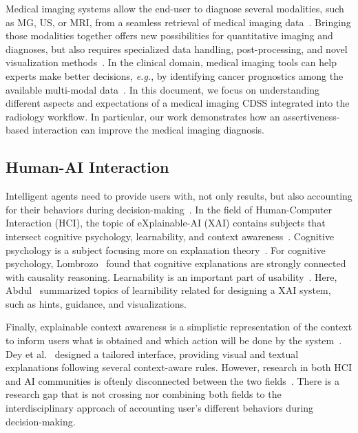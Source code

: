 Medical imaging systems allow the end-user to diagnose several modalities, such as MG, US, or MRI, from a seamless retrieval of medical imaging data~\cite{faraji2019radiologic}.
Bringing those modalities together offers new possibilities for quantitative imaging and diagnoses, but also requires specialized data handling, post-processing, and novel visualization methods~\cite{Igarashi:2016:IVS:2984511.2984537}.
In the clinical domain, medical imaging tools can help experts make better decisions, {\it e.g.}, by identifying cancer prognostics among the available multi-modal data~\cite{IBRAHIM2019438, Tan2023}.
In this document, we focus on understanding different aspects and expectations of a medical imaging CDSS integrated into the radiology workflow.
In particular, our work demonstrates how an assertiveness-based interaction can improve the medical imaging diagnosis.

\subsection{Human-AI Interaction}
\label{sec:chap006002001}

Intelligent agents need to provide users with, not only results, but also accounting for their behaviors during decision-making~\cite{10.1145/3313831.3376807}.
In the field of Human-Computer Interaction (HCI), the topic of eXplainable-AI (XAI) contains subjects that intersect cognitive psychology, learnability, and context awareness~\cite{doi:10.1073/pnas.1618211113, doi:10.1080/07370024.2021.1977128}.
Cognitive psychology is a subject focusing more on explanation theory~\cite{10.1093/mind/fzu023}.
For cognitive psychology, Lombrozo~\cite{LOMBROZO2010303} found that cognitive explanations are strongly connected with causality reasoning.
Learnability is an important part of usability~\cite{10.1145/1753326.1753552}.
Here, Abdul~\cite{10.1145/3173574.3174156} summarized topics of learnibility related for designing a XAI system, such as hints, guidance, and visualizations.

Finally, explainable context awareness is a simplistic representation of the context to inform users what is obtained and which action will be done by the system~\cite{10.1145/3313831.3376545}.
Dey et al.~\cite{10.1145/1518701.1518832} designed a tailored interface, providing visual and textual explanations following several context-aware rules.
However, research in both HCI and AI communities is oftenly disconnected between the two fields~\cite{10.1145/3173574.3174156, 10.1145/3313831.3376807}.
There is a research gap that is not crossing nor combining both fields to the interdisciplinary approach of accounting user's different behaviors during decision-making.

